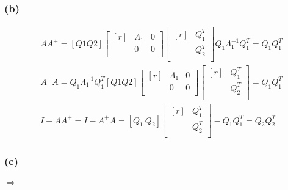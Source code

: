 \subsubsection*{(b)}
\begin{align*}
&AA^+ = [Q1 Q2]\begin{bmatrix*}[r]
&\Lambda_1 &0 \\&0 &0\\
\end{bmatrix*}\begin{bmatrix*}[r]
&Q^T_1 \\&Q^T_2 \\
\end{bmatrix*}Q_1\Lambda^{-1}_1Q_1^T = Q_1Q_1^T \\
&A^+A =Q_1\Lambda^{-1}_1Q_1^T[Q1 Q2]\begin{bmatrix*}[r]
&\Lambda_1 &0 \\&0 &0\\
\end{bmatrix*}\begin{bmatrix*}[r]
&Q^T_1 \\&Q^T_2 \\
\end{bmatrix*} =  Q_1Q_1^T
\end{align*}
\begin{align*}
I- AA^+ = I-A^+A = [Q_1\ Q_2]\begin{bmatrix*}[r]
&Q^T_1 \\&Q^T_2 \\
\end{bmatrix*} -  Q_1Q_1^T = Q_2Q_2^T
\end{align*}
\subsubsection*{(c)}
\paragraph{}
$\Rightarrow$
